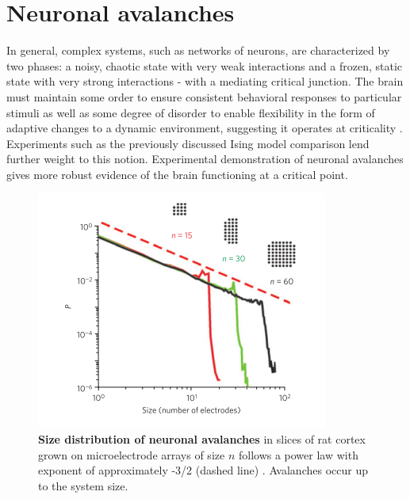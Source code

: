 \documentclass[12pt]{article}
\begin{document}
\section*{Neuronal avalanches}

In general, complex systems, such as networks of neurons, are characterized by two phases: a noisy, chaotic state with very weak interactions and a frozen, static state with very strong interactions - with a mediating critical junction. The brain must maintain some order to ensure consistent behavioral responses to particular stimuli as well as some degree of disorder to enable flexibility in the form of adaptive changes to a dynamic environment, suggesting it operates at criticality \cite{Bak1987a}. Experiments such as the previously discussed Ising model comparison lend further weight to this notion. Experimental demonstration of neuronal avalanches gives more robust evidence of the brain functioning at a critical point.

\begin{figure}      
  \begin{center}    
 \includegraphics[width=.5\textwidth]{originalavalancheplenz}    
    \caption{\textbf{Size distribution of neuronal avalanches} in slices of rat cortex grown on microelectrode arrays of size $n$ follows a power law with exponent of approximately -3/2 (dashed line) \cite{Beggs2003b}. Avalanches occur up to the system size.}
   \label{Figure::Neuronal Avalanches}   
  \end{center}     
   \end{figure}
\end{document}
